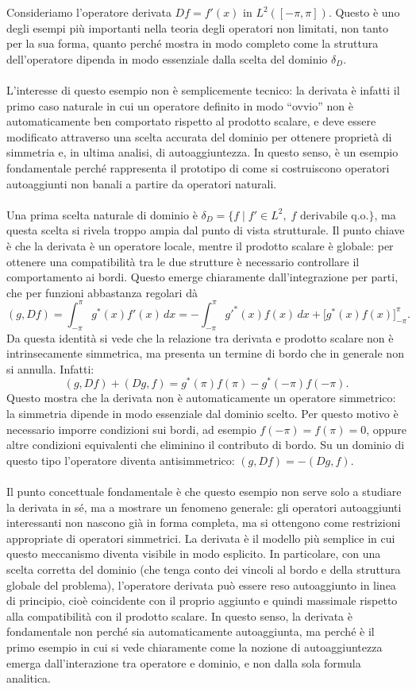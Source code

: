 \documentclass[a4paper,12pt]{report}
\begin{document}
Consideriamo l’operatore derivata $Df = f'(x)$  in \(L^2([-\pi,\pi])\). Questo è uno degli esempi più importanti nella teoria degli operatori non limitati, non tanto per la sua forma, quanto perché mostra in modo completo come la struttura dell’operatore dipenda in modo essenziale dalla scelta del dominio \(\delta_D\).
\\
\\L’interesse di questo esempio non è semplicemente tecnico: la derivata è infatti il primo caso naturale in cui un operatore definito in modo “ovvio” non è automaticamente ben comportato rispetto al prodotto scalare, e deve essere modificato attraverso una scelta accurata del dominio per ottenere proprietà di simmetria e, in ultima analisi, di autoaggiuntezza. In questo senso, è un esempio fondamentale perché rappresenta il prototipo di come si costruiscono operatori autoaggiunti non banali a partire da operatori naturali.
\\
\\Una prima scelta naturale di dominio è $\delta_D = \{ f \mid f' \in L^2,\; f \text{ derivabile q.o.} \}$, ma questa scelta si rivela troppo ampia dal punto di vista strutturale. Il punto chiave è che la derivata è un operatore locale, mentre il prodotto scalare è globale: per ottenere una compatibilità tra le due strutture è necessario controllare il comportamento ai bordi. Questo emerge chiaramente dall’integrazione per parti, che per funzioni abbastanza regolari dà
\[
(g, Df)
= \int_{-\pi}^{\pi} g^*(x) f'(x)\,dx
= -\int_{-\pi}^{\pi} g'^*(x) f(x)\,dx
+ \Big[g^*(x)f(x)\Big]_{-\pi}^{\pi}.
\]
Da questa identità si vede che la relazione tra derivata e prodotto scalare non è intrinsecamente simmetrica, ma presenta un termine di bordo che in generale non si annulla. Infatti:
\[
(g, Df) + (Dg, f)
= g^*(\pi)f(\pi) - g^*(-\pi)f(-\pi).
\]
Questo mostra che la derivata non è automaticamente un operatore simmetrico: la simmetria dipende in modo essenziale dal dominio scelto. Per questo motivo è necessario imporre condizioni sui bordi, ad esempio \(f(-\pi)=f(\pi)=0\), oppure altre condizioni equivalenti che eliminino il contributo di bordo. Su un dominio di questo tipo l’operatore diventa antisimmetrico: $(g, Df) = -(Dg, f)$.
\\
\\Il punto concettuale fondamentale è che questo esempio non serve solo a studiare la derivata in sé, ma a mostrare un fenomeno generale: gli operatori autoaggiunti interessanti non nascono già in forma completa, ma si ottengono come restrizioni appropriate di operatori simmetrici. La derivata è il modello più semplice in cui questo meccanismo diventa visibile in modo esplicito. In particolare, con una scelta corretta del dominio (che tenga conto dei vincoli al bordo e della struttura globale del problema), l’operatore derivata può essere reso autoaggiunto in linea di principio, cioè coincidente con il proprio aggiunto e quindi massimale rispetto alla compatibilità con il prodotto scalare.
In questo senso, la derivata è fondamentale non perché sia automaticamente autoaggiunta, ma perché è il primo esempio in cui si vede chiaramente come la nozione di autoaggiuntezza emerga dall’interazione tra operatore e dominio, e non dalla sola formula analitica.
\end{document}
